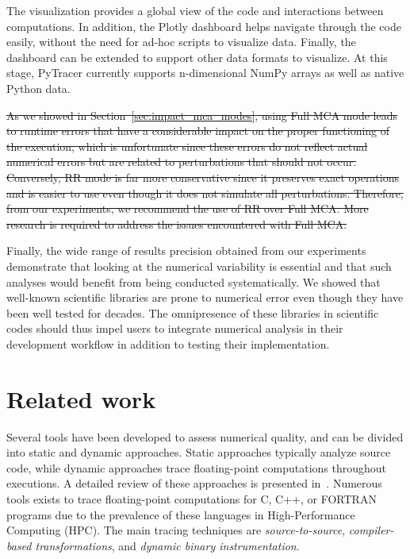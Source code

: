 \documentclass[10pt,journal,compsoc]{IEEEtran}
\newcommand{\pytracer}[0]{PyTracer\xspace}
\DeclareRobustCommand{\remove}[1]{\textcolor{lightred}{\sout{#1}}}
\DeclareRobustCommand{\remove}[1]{}
\begin{document}
The visualization provides a global view of the code and interactions between
computations. In addition, the Plotly dashboard helps navigate through the code
easily, without the need for ad-hoc scripts to visualize data. Finally, the
dashboard can be extended to support other data formats to visualize. At this
stage, \pytracer currently supports n-dimensional NumPy arrays as well as native
Python data. 

\remove{
    As we showed in Section~\ref{sec:impact_mca_modes}, using Full MCA mode leads to
    runtime errors that have a considerable impact on the proper functioning of the
    execution, which is unfortunate since these errors do not reflect actual
    numerical errors but are related to perturbations that should not occur.
    Conversely, RR mode is far more conservative since it preserves exact operations
    and is easier to use even though it does not simulate all perturbations.
    Therefore, from our experiments, we recommend the use of RR over Full MCA. More
    research is required to address the issues encountered with Full MCA. 
}


Finally, the wide range of results precision obtained from our experiments
demonstrate that looking at the numerical variability is essential and that such
analyses would benefit from being conducted systematically. We showed that
well-known scientific libraries are prone to numerical error even though they
have been well tested for decades. The omnipresence of these libraries in
scientific codes should thus impel users to integrate numerical analysis in
their development workflow in addition to testing their implementation.

\section{Related work}

Several tools have been developed to assess numerical quality, and can be
divided into static and dynamic approaches. Static approaches typically analyze
source code, while dynamic approaches trace floating-point computations
throughout executions. A detailed review of these approaches is presented
in~\cite{cherubin2020tools}. 
Numerous tools exists to trace floating-point computations for C, C++, or
FORTRAN programs due to the prevalence of these languages in High-Performance
Computing (HPC). The main tracing techniques are \textit{source-to-source},
\textit{compiler-based transformations}, and \textit{dynamic binary
    instrumentation}.
\end{document}
